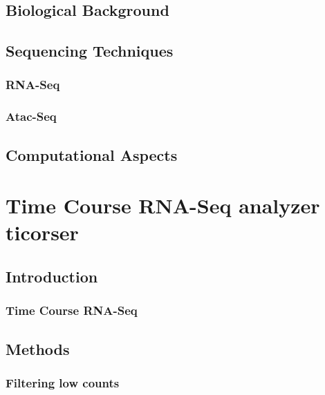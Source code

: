 \documentclass[b5paper,oneside,british,intoc,bibliograph=totoc,index=totoc,BCOR10mm,twoside,openright]{book}
\numberwithin{equation}{section}
\numberwithin{figure}{section}
\begin{document}
\section{Biological Background}


\section{Sequencing Techniques}
\subsection{RNA-Seq} \label{sec:rnaseq}

\subsection{Atac-Seq} \label{sec:atacseq}


\section{Computational Aspects}


\chapter{Time Course RNA-Seq analyzer \newline ticorser} \label{sec:ticorsecap}


\section{Introduction} \label{sec:ticorseintro}


\subsection{Time Course RNA-Seq} \label{sec:ticorsernaseq}

\section{Methods} \label{sec:ticorseintromethods}


\subsection{Filtering low counts} \label{sec:ticorserfiltering}

\end{document}
